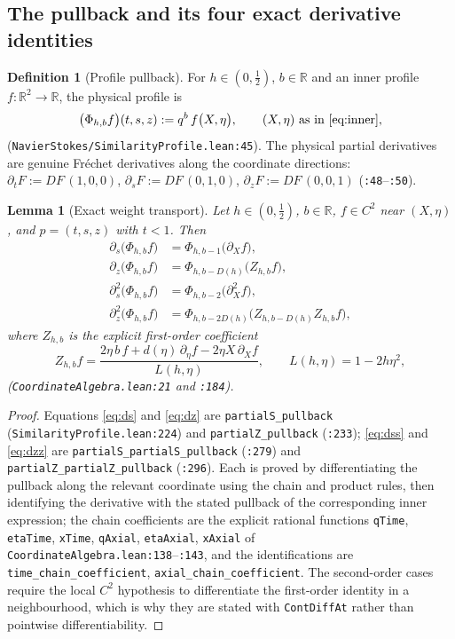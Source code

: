 \documentclass[11pt]{article}
\newcommand{\R}{\mathbb{R}}
\newcommand{\Ph}{\Phi}
\newcommand{\ct}[1]{\texttt{#1}}
\newcommand{\file}[1]{\texttt{\small #1}}
\theoremstyle{plain}
\newtheorem{lemma}[theorem]{Lemma}
\theoremstyle{definition}
\newtheorem{definition}[theorem]{Definition}
\theoremstyle{remark}
\begin{document}
\subsection{The pullback and its four exact derivative identities}

\begin{definition}[Profile pullback]
\label{def:pullback}
For $h\in(0,\tfrac12)$, $b\in\R$ and an inner profile
$f:\R^2\to\R$, the physical profile is
\[
  \bigl(\Ph_{h,b}f\bigr)(t,s,z):=q^{b}\,f\bigl(X,\eta\bigr),
  \qquad (X,\eta)\ \text{as in }\eqref{eq:inner},
\]
(\file{NavierStokes/SimilarityProfile.lean:45}). The physical partial
derivatives are genuine Fréchet derivatives along the coordinate directions:
$\partial_tF:=DF\,(1,0,0)$, $\partial_sF:=DF\,(0,1,0)$,
$\partial_zF:=DF\,(0,0,1)$ (\file{:48}--\file{:50}).
\end{definition}

\begin{lemma}[Exact weight transport]
\label{lem:pullback}
Let $h\in(0,\tfrac12)$, $b\in\R$, $f\in C^{2}$ near $(X,\eta)$, and
$p=(t,s,z)$ with $t<1$. Then
\begin{align}
  \partial_s\bigl(\Ph_{h,b}f\bigr) &= \Ph_{h,b-1}\bigl(\partial_X f\bigr),
  \label{eq:ds}\\[2pt]
  \partial_z\bigl(\Ph_{h,b}f\bigr) &= \Ph_{h,b-D(h)}\bigl(Z_{h,b}f\bigr),
  \label{eq:dz}\\[2pt]
  \partial_s^{2}\bigl(\Ph_{h,b}f\bigr) &= \Ph_{h,b-2}\bigl(\partial_X^{2}f\bigr),
  \label{eq:dss}\\[2pt]
  \partial_z^{2}\bigl(\Ph_{h,b}f\bigr) &=
  \Ph_{h,b-2D(h)}\bigl(Z_{h,b-D(h)}Z_{h,b}f\bigr),
  \label{eq:dzz}
\end{align}
where $Z_{h,b}$ is the explicit first-order coefficient
\[
  Z_{h,b}f=\frac{2\eta\,b\,f+d(\eta)\,\partial_\eta f-2\eta X\,\partial_X f}
              {L(h,\eta)},
  \qquad L(h,\eta)=1-2h\eta^{2},
\]
(\file{CoordinateAlgebra.lean:21} and \file{:184}).
\end{lemma}

\begin{proof}[Proof]
Equations \eqref{eq:ds} and \eqref{eq:dz} are
\ct{partialS\_pullback} (\file{SimilarityProfile.lean:224}) and
\ct{partialZ\_pullback} (\file{:233}); \eqref{eq:dss} and \eqref{eq:dzz} are
\ct{partialS\_partialS\_pullback} (\file{:279}) and
\ct{partialZ\_partialZ\_pullback} (\file{:296}). Each is proved by
differentiating the pullback along the relevant coordinate using the chain and
product rules, then identifying the derivative with the stated pullback of the
corresponding inner expression; the chain coefficients are the explicit
rational functions \ct{qTime}, \ct{etaTime}, \ct{xTime}, \ct{qAxial},
\ct{etaAxial}, \ct{xAxial} of \file{CoordinateAlgebra.lean:138}--\file{:143},
and the identifications are \ct{time\_chain\_coefficient},
\ct{axial\_chain\_coefficient}. The second-order cases require the local
$C^2$ hypothesis to differentiate the first-order identity in a neighbourhood,
which is why they are stated with \ct{ContDiffAt} rather than pointwise
differentiability.
\end{proof}
\end{document}

